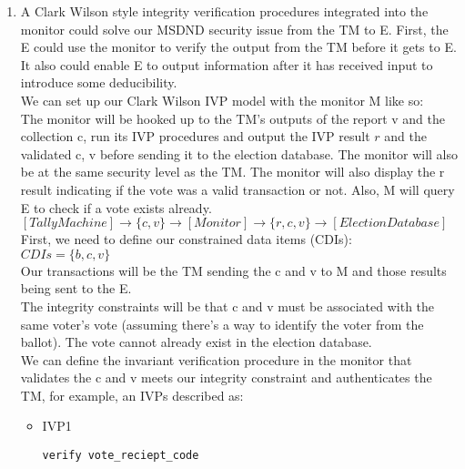 \documentclass[journal,onecolumn]{IEEEtran}
\begin{document}
\begin{enumerate}
\begin{enumerate}
    \end{enumerate}
    \item A Clark Wilson style integrity verification procedures integrated into the monitor could solve our MSDND security issue from the TM to E. First, the E could use the monitor to verify the output from the TM before it gets to E. It also could enable E to output information after it has received input to introduce some deducibility. \\
    
    We can set up our Clark Wilson IVP model with the monitor M like so: \\

    The monitor will be hooked up to the TM's outputs of the report v and the collection c, run its IVP procedures and output the IVP result $r$ and the validated c, v before sending it to the election database. The monitor will also be at the same security level as the TM. The monitor will also display the r result indicating if the vote was a valid transaction or not. Also, M will query E to check if a vote exists already. \\

    $[Tally Machine] \rightarrow \{c, v\} \rightarrow [Monitor] \rightarrow \{r, c, v\} \rightarrow [Election Database]$ \\

    First, we need to define our constrained data items (CDIs): \\

    $CDIs = \{b, c, v\}$\\

    Our transactions will be the TM sending the c and v to M and those results being sent to the E. \\

    The integrity constraints will be that c and v must be associated with the same voter's vote (assuming there's a way to identify the voter from the ballot). The vote cannot already exist in the election database. \\

    We can define the invariant verification procedure in the monitor that validates the c and v meets our integrity constraint and authenticates the TM, for example, an IVPs described as:\\

\begin{itemize}
  \item IVP1
\begin{lstlisting}
verify vote_reciept_code


\end{lstlisting}
\end{itemize}
\end{enumerate}
\end{document}
